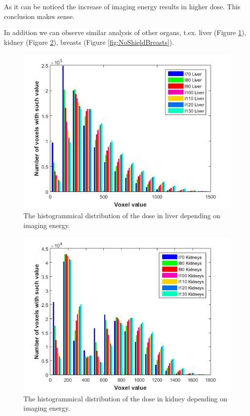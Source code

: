 \documentclass[fleqn,10pt]{SelfArx} %
\begin{document}
As it can be noticed the increase of imaging energy results in higher dose. This conclusion makes sense.

In addition we can observe similar analysis of other organs, t.ex. liver (Figure \ref{fig:NoShieldLiver}), kidney (Figure \ref{fig:NoShieldKidneys}), breasts (Figure \ref{fig:NoShieldBreasts}).

\begin{figure}[!hbt]\centering
\includegraphics[width=\linewidth]{NoShieldLiver}
\caption{The histogrammical distribution of the dose in liver depending on imaging energy.}
\label{fig:NoShieldLiver}
\end{figure}

\begin{figure}[!hbt]\centering
\includegraphics[width=\linewidth]{NoShieldKidneys}
\caption{The histogrammical distribution of the dose in kidney depending on imaging energy.}
\label{fig:NoShieldKidneys}
\end{figure}
\end{document}
